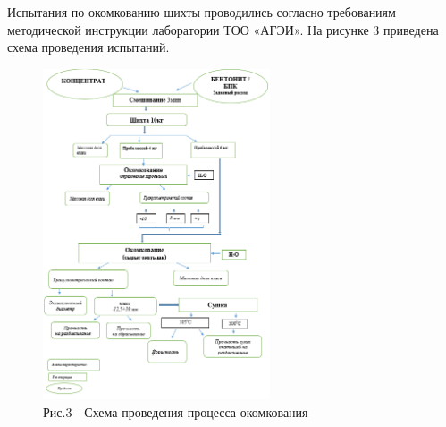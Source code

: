Испытания по окомкованию шихты проводились согласно требованиям
методической инструкции лаборатории ТОО «АГЭИ». На рисунке 3 приведена
схема проведения испытаний.

\begin{figure}[H]
	\centering
	\includegraphics[width=0.6\textwidth]{media/chem2/image64}
	\caption*{Рис.3 - Схема проведения процесса окомкования}
\end{figure}
\vspace{-2em}
